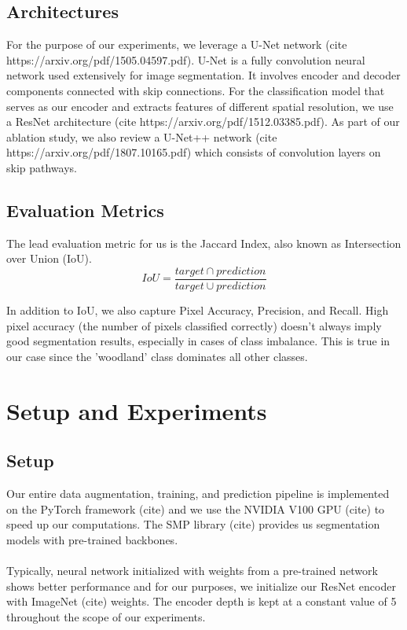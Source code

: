 \documentclass[conference]{IEEEtran}
\begin{document}
\subsection{Architectures}

For the purpose of our experiments, we leverage a U-Net network (cite https://arxiv.org/pdf/1505.04597.pdf). U-Net is a fully convolution neural network used extensively for image segmentation. It involves encoder and decoder components connected with skip connections. For the classification model that serves as our encoder and extracts features of different spatial resolution, we use a ResNet architecture (cite https://arxiv.org/pdf/1512.03385.pdf). As part of our ablation study, we also review a U-Net++ network (cite https://arxiv.org/pdf/1807.10165.pdf) which consists of convolution layers on skip pathways.

\subsection{Evaluation Metrics}
 The lead evaluation metric for us is the Jaccard Index, also known as Intersection over Union (IoU).
\begin{equation*}
    IoU=\frac{target \cap prediction}{target \cup prediction}
\end{equation*}

In addition to IoU, we also capture Pixel Accuracy, Precision, and Recall. High pixel accuracy (the number of pixels classified correctly) doesn't always imply good segmentation results, especially in cases of class imbalance. This is true in our case since the 'woodland' class dominates all other classes.

\section{Setup and Experiments}

\subsection{Setup}
Our entire data augmentation, training, and prediction pipeline is implemented on the PyTorch framework (cite) and we use the NVIDIA V100 GPU (cite) to speed up our computations. The SMP library (cite) provides us segmentation models with pre-trained backbones. 
\\
\\Typically, neural network initialized with weights from a pre-trained network shows better performance and for our purposes, we initialize our ResNet encoder with ImageNet (cite) weights. The encoder depth is kept at a constant value of 5 throughout the scope of our experiments. 
\end{document}
